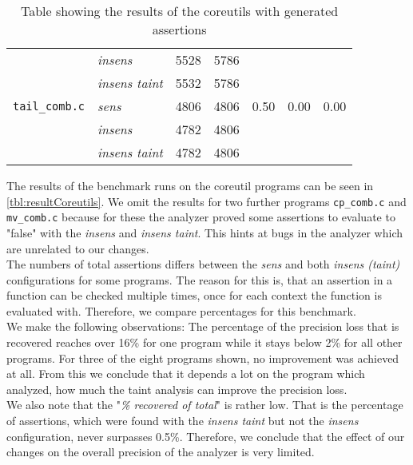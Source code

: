 \begin{table}
\begin{tabular}{l|l||r|r||r|r|r}
          & \textit{insens} & 5528 & 5786 & & & \\
          & \textit{insens taint} & 5532 & 5786 & & & \\
          \hline         
          \texttt{tail\_comb.c} & \textit{sens} & 4806 & 4806 & 0.50 & 0.00 & 0.00\\
          & \textit{insens} & 4782 & 4806 & & & \\
          & \textit{insens taint} & 4782 & 4806 & & & \\
          \hline
        \end{tabular}
        \caption{Table showing the results of the coreutils with generated assertions}
        \label{tbl:resultCoreutils}
      \end{table}

      The results of the benchmark runs on the coreutil programs can be seen in \autoref{tbl:resultCoreutils}. We omit the results for two further programs \texttt{cp\_comb.c} and \texttt{mv\_comb.c} because for these the analyzer proved some assertions to evaluate to "false" with the \textit{insens} and \textit{insens taint}. This hints at bugs in the analyzer which are unrelated to our changes.\\
      The numbers of total assertions differs between the \textit{sens} and both \textit{insens (taint)} configurations for some programs. The reason for this is, that an assertion in a function can be checked multiple times, once for each context the function is evaluated with. Therefore, we compare percentages for this benchmark.\\
      We make the following observations: The percentage of the precision loss that is recovered reaches over 16\% for one program while it stays below 2\% for all other programs. For three of the eight programs shown, no improvement was achieved at all. From this we conclude that it depends a lot on the program which analyzed, how much the taint analysis can improve the precision loss.\\
      We also note that the "\textit{\% recovered of total}" is rather low. That is the percentage of assertions, which were found with the \textit{insens taint} but not the \textit{insens} configuration, never surpasses 0.5\%. Therefore, we conclude that the effect of our changes on the overall precision of the analyzer is very limited.      
    
